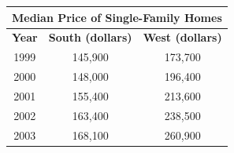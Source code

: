 \documentclass[11pt]{article}
\begin{document}
\begin{enumerate}
        {\renewcommand{\arraystretch}{1.3}
            \begin{tabular}{|c|c|c|}
                \hline
                \multicolumn{3}{|c|}{\textbf{Median Price of Single-Family Homes}} \\ \hline
                \textbf{Year} & \textbf{South (dollars)} & \textbf{West (dollars)} \\ \hline
                1999          & 145{,}900                & 173{,}700               \\ \hline
                2000          & 148{,}000                & 196{,}400               \\ \hline
                2001          & 155{,}400                & 213{,}600               \\ \hline
                2002          & 163{,}400                & 238{,}500               \\ \hline
                2003          & 168{,}100                & 260{,}900               \\ \hline
            \end{tabular}}

    \end{enumerate}
\end{document}
